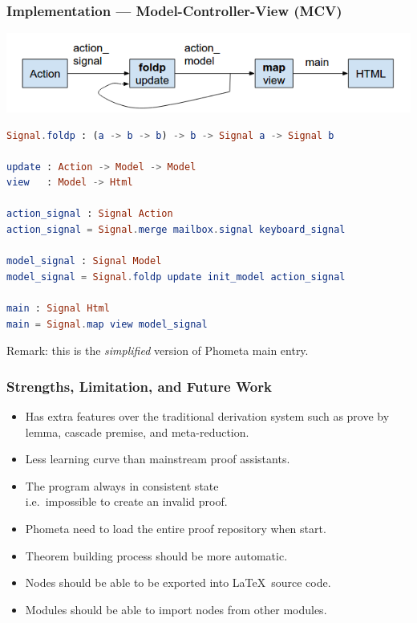 \documentclass[notes]{beamer}
\begin{document}
\begin{frame}[fragile]
\frametitle{Implementation --- Model-Controller-View (MCV)}
\vspace{-1em}
\begin{center}
\includegraphics[width=0.9\linewidth,height=\textheight,keepaspectratio]{demo-imp-2}
\end{center}
\vspace{-1em}
\begin{adjustwidth}{2em}{0em}
\begin{lstlisting}[language=elm,basicstyle=\scriptsize\ttfamily,]
Signal.foldp : (a -> b -> b) -> b -> Signal a -> Signal b

update : Action -> Model -> Model
view   : Model -> Html

action_signal : Signal Action
action_signal = Signal.merge mailbox.signal keyboard_signal

model_signal : Signal Model
model_signal = Signal.foldp update init_model action_signal

main : Signal Html
main = Signal.map view model_signal
\end{lstlisting}
\end{adjustwidth}
\begin{flushright}
Remark: this is the \emph{simplified} version of Phometa main entry.
\end{flushright}
\end{frame}

\begin{frame}
\frametitle{Strengths, Limitation, and Future Work}

\begin{itemize}
\item Has extra features over the traditional derivation system such as prove by
  lemma, cascade premise, and meta-reduction.
\item Less learning curve than mainstream proof assistants.
\item The program always in consistent state\\i.e.\ impossible to create an
  invalid proof.\\[3em]
\item Phometa need to load the entire proof repository when start.
\item Theorem building process should be more automatic.
\item Nodes should be able to be exported into \LaTeX\ source code.
\item Modules should be able to import nodes from other modules.
\end{itemize}
\end{frame}
\end{document}
